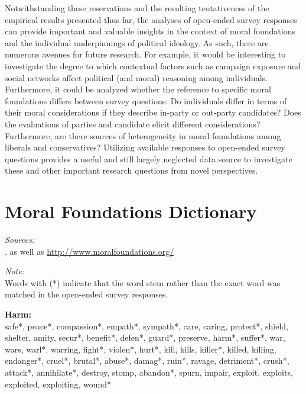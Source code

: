 \documentclass[12pt]{article}
\begin{document}
Notwithstanding these reservations and the resulting tentativeness of the empirical results presented thus far, the analyses of open-ended survey responses can provide important and valuable insights in the context of moral foundations and the individual underpinnings of political ideology. As such, there are numerous avenues for future research. For example, it would be interesting to investigate the degree to which contextual factors such as campaign exposure and social networks affect political (and moral) reasoning among individuals. Furthermore, it could be analyzed whether the reference to specific moral foundations differs between survey questions: Do individuals differ in terms of their moral considerations if they describe in-party or out-party candidates? Does the evaluations of parties and candidate elicit different considerations? Furthermore, are there sources of heterogeneity in moral foundations among liberals and conservatives? Utilizing available responses to open-ended survey questions provides a useful and still largely neglected data source to investigate these and other important research questions from novel perspectives.


\clearpage\flushleft\footnotesize
\appendices
\section{Moral Foundations Dictionary}
\renewcommand\thefigure{\thesection.\arabic{figure}}
\renewcommand\thetable{\thesection.\arabic{table}}
\setcounter{figure}{0}
\setcounter{table}{0}

\textit{Sources:}\\
\citet{graham2009liberals}, as well as \url{http://www.moralfoundations.org/}
\vspace{.5cm}

\textit{Note:}\\
Words with (*) indicate that the word stem rather than the exact word was matched in the open-ended survey responses.
\vspace{.5cm}

\textbf{Harm:}\\
safe*, peace*, compassion*, empath*, sympath*, care, caring, protect*, shield, shelter, amity, secur*, benefit*, defen*, guard*, preserve, harm*, suffer*, war, wars, warl*, warring, fight*, violen*, hurt*, kill, kills, killer*, killed, killing, endanger*, cruel*, brutal*, abuse*, damag*, ruin*, ravage, detriment*, crush*, attack*, annihilate*, destroy, stomp, abandon*, spurn, impair, exploit, exploits, exploited, exploiting, wound*
\vspace{.5cm}
\end{document}
